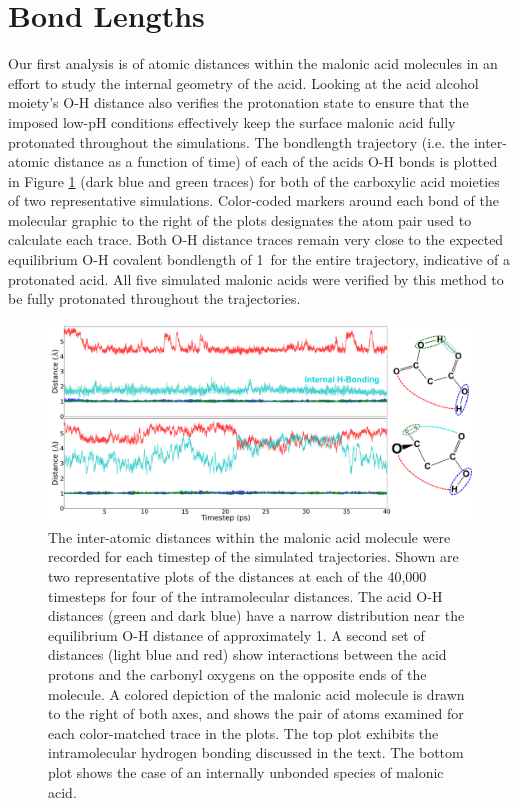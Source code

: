 \section{Bond Lengths}

Our first analysis is of atomic distances within the malonic acid molecules in an effort to study the internal geometry of the acid. Looking at the acid alcohol moiety's O-H distance also verifies the protonation state to ensure that the imposed low-pH conditions effectively keep the surface malonic acid fully protonated throughout the simulations. The bondlength trajectory (i.e. the inter-atomic distance as a function of time) of each of the acids O-H bonds is plotted in Figure \ref{fig:bondlength-trajectory} (dark blue and green traces) for both of the carboxylic acid moieties of two representative simulations. Color-coded markers around each bond of the molecular graphic to the right of the plots designates the atom pair used to calculate each trace. Both O-H distance traces remain very close to the expected equilibrium O-H covalent bondlength of 1\angs~for the entire trajectory, indicative of a protonated acid. All five simulated malonic acids were verified by this method to be fully protonated throughout the trajectories.

\begin{figure}[h!]
	\begin{center}
		\includegraphics[scale=1.0]{images/bond-length/bondlengths.png}
		\caption{The inter-atomic distances within the malonic acid molecule were recorded for each timestep of the simulated trajectories. Shown are two representative plots of the distances at each of the 40,000 timesteps for four of the intramolecular distances. The acid O-H distances (green and dark blue) have a narrow distribution near the equilibrium O-H distance of approximately 1\angs. A second set of distances (light blue and red) show interactions between the acid protons and the carbonyl oxygens on the opposite ends of the molecule. A colored depiction of the malonic acid molecule is drawn to the right of both axes, and shows the pair of atoms examined for each color-matched trace in the plots. The top plot exhibits the intramolecular hydrogen bonding discussed in the text. The bottom plot shows the case of an internally unbonded species of malonic acid.}
		\label{fig:bondlength-trajectory}
	\end{center}
\end{figure}

